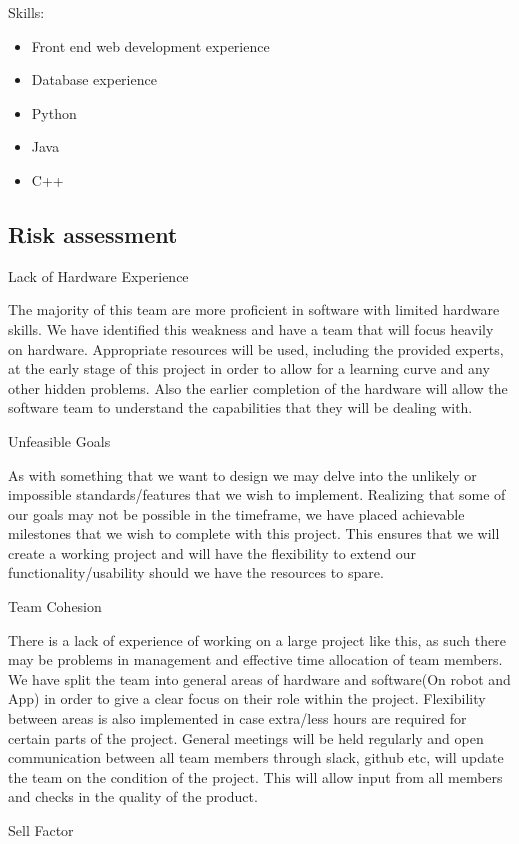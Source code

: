 \documentclass{article}
\begin{document}
Skills: 
\begin{itemize}
\item Front end web development experience
\item Database experience
\item Python
\item Java
\item C++
\end{itemize}
\subsection{Risk assessment} 

Lack of Hardware Experience

The majority of this team are more proficient in software with limited hardware skills. We have identified this weakness and have a team that will focus heavily on hardware. Appropriate resources will be used, including the provided experts, at the early stage of this project in order to allow for a learning curve and any other hidden problems. Also the earlier completion of the hardware will allow the software team to understand the capabilities that they will be dealing with.

Unfeasible Goals

As with something that we want to design we may delve into the unlikely or impossible standards/features that we wish to implement. Realizing that some of our goals may not be possible in the timeframe, we have placed achievable milestones that we wish to complete with this project. This ensures that we will create a working project and will have the flexibility to extend our functionality/usability should we have the resources to spare.

Team Cohesion

There is a lack of experience of working on a large project like this, as such there may be problems in management and effective time allocation of team members. We have split the team into general areas of hardware and software(On robot and App) in order to give a clear focus on their role within the project. Flexibility between areas is also implemented in case extra/less hours are required for certain parts of the project. General meetings will be held regularly and open communication between all team members through slack, github etc, will update the team on the condition of the project. This will allow input from all members and checks in the quality of the product.

Sell Factor
\end{document}
